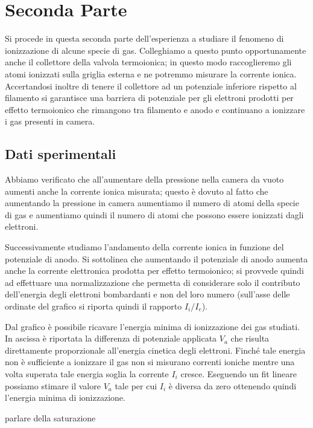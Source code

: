 \documentclass[11pt,a4paper]{article}
\begin{document}
\newpage
\section{Seconda Parte}
 
Si procede in questa seconda parte dell'esperienza a studiare il fenomeno di ionizzazione di alcune specie di gas. Colleghiamo a questo punto opportunamente anche il collettore della valvola termoionica; in questo modo raccoglieremo gli atomi ionizzati sulla griglia esterna e ne potremmo misurare la corrente ionica. Accertandosi inoltre di tenere il collettore ad un potenziale inferiore rispetto al filamento si garantisce una barriera di potenziale per gli elettroni prodotti per effetto termoionico che rimangono tra filamento e anodo e continuano a ionizzare i gas presenti in camera.

\subsection{Dati sperimentali}

Abbiamo verificato che all'aumentare della pressione nella camera da vuoto aumenti anche la corrente ionica misurata; questo è dovuto al fatto che aumentando la pressione in camera aumentiamo il numero di atomi della specie di gas e aumentiamo quindi il numero di atomi che possono essere ionizzati dagli elettroni.

Successivamente studiamo l'andamento della corrente ionica in funzione del potenziale di anodo. Si sottolinea che aumentando il potenziale di anodo aumenta anche la corrente elettronica prodotta per effetto termoionico; si provvede quindi ad effettuare una normalizzazione che permetta di considerare solo il contributo dell'energia degli elettroni bombardanti e non del loro numero (sull'asse delle ordinate del grafico si riporta quindi il rapporto $I_{i}/I_{e}$).

Dal grafico è possibile ricavare l'energia minima di ionizzazione dei gas studiati. In ascissa è riportata la differenza di potenziale applicata $V_{a}$ che risulta direttamente proporzionale all'energia cinetica degli elettroni. Finché tale energia non è sufficiente a ionizzare il gas non si misurano correnti ioniche mentre una volta superata tale energia soglia la corrente $I_{i}$ cresce. Eseguendo un fit lineare possiamo stimare il valore $V_{a}$ tale per cui $I_{i}$ è diversa da zero ottenendo quindi l'energia minima di ionizzazione.
 

parlare della saturazione
\end{document}
